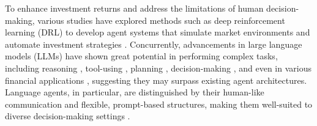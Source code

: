 To enhance investment returns and address the limitations of human decision-making, various studies have explored methods such as deep reinforcement learning (DRL) to develop agent systems that simulate market environments and automate investment strategies \cite{wang2021commission, han2023select, qin2024earnhft}. Concurrently, advancements in large language models (LLMs) have shown great potential in performing complex tasks, including reasoning \cite{huang2022towards, jin2024impact}, tool-using \cite{cai2023large}, planning \cite{ruan2023tptu}, decision-making \cite{song2023llm, paranjape2023art}, and even in various financial applications \cite{NEURIPS2023_6a386d70, 10.1145/3637528.3671554, xie2024finben, hu2024no, yang2024ucfe}, suggesting they may surpass existing agent architectures. Language agents, in particular, are distinguished by their human-like communication and flexible, prompt-based structures, making them well-suited to diverse decision-making settings \cite{park2023generative, wu2023autogen, qiao2024autoact, hong2023metagpt}.

